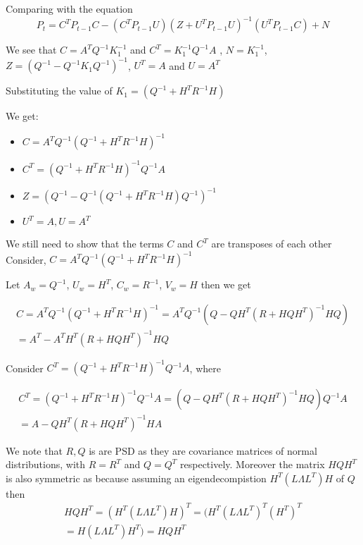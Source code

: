 \documentclass{tufte-handout}
\begin{document}
\begin{enumerate}[(a)]
Comparing with the equation 
    \begin{equation*}
        P_t = C^TP_{t-1}C - (C^T P_{t-1}U)(Z + U^TP_{t-1}U)^{-1}(U^TP_{t-1}C) + N
    \end{equation*}

    We see that $C = A^TQ^{-1}K_1^{-1} $ and  $C^T = K_1^{-1} Q^{-1}A$ , $N = K_1^{-1}$, $Z = (Q^{-1} - Q^{-1}K_1 Q^{-1})^{-1} $, $U^T =A $ and $U = A^T$

    Substituting the value of $K_1=(Q^{-1}  + H^TR^{-1}H) $

    We get: 
    \begin{itemize}
        \item  $C = A^TQ^{-1}(Q^{-1} + H^T R^{-1}H)^{-1}$
        \item  $C^T = (Q^{-1} + H^T R^{-1}H)^{-1}Q^{-1}A$
        \item $Z  = (Q^{-1} - Q^{-1}(Q^{-1}  + H^TR^{-1}H) Q^{-1})^{-1} $
        \item $U^T = A, U = A^T$
    \end{itemize}
\end{enumerate}

We still need to show that the terms $C$ and $C^T$ are transposes 
of each other Consider, $C = A^TQ^{-1}(Q^{-1} + H^T R^{-1}H)^{-1}$

Let $A_w = Q^{-1}$, $U_w = H^T$, $C_w = R^{-1}$, $V_w = H$ then 
we get 

\begin{multline*}
    C  = A^{T}Q^{-1}(Q^{-1} + H^{T}R^{-1} H)^{-1} 
       =  A^T Q^{-1} ( Q - Q H^T (R + HQH^T)^{-1}HQ) \\ 
       =  A^T  - A^T H^T ( R + HQH^T)^{-1}  HQ
\end{multline*}


Consider $C^T = (Q^{-1} + H^T R^{-1}H)^{-1}Q^{-1}A$, where

\begin{multline}
   C^T = (Q^{-1} + H^T R^{-1}H)^{-1}Q^{-1}A  
       = (Q  - Q H^T (R + HQH^T)^{-1} HQ) Q^{-1}A \\ 
       = A - QH^T (R + HQH^T)^{-1} H A
       \label{c-transpose}
\end{multline}

We note that $R, Q$ is are PSD as they are covariance matrices of normal distributions, with $R = R^T$ and  $Q = Q^T$ respectively.  Moreover the matrix 
$H Q H^T$  is also symmetric as because assuming an 
eigendecompistion \cite{enwiki:1158373968} $H^T ( L \Lambda L ^T ) H$ of $Q$
then 
\begin{multline}
    HQH^T = (H^T (L \Lambda L^T) H)^T =  (H^T (L \Lambda L^T) ^T (H^T)^T \\ 
     = H (L \Lambda L^T) H^T) =   HQH^T
\end{multline}
\end{document}
